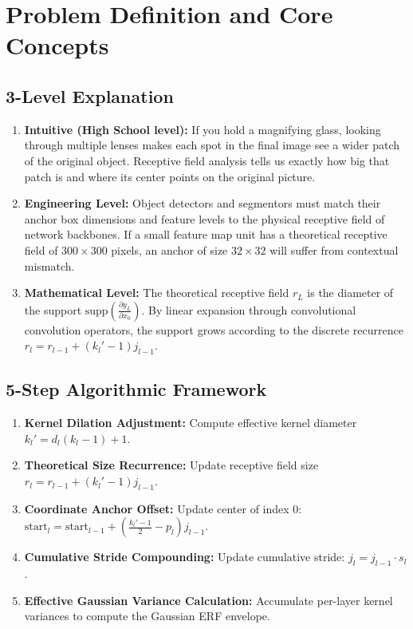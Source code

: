 \documentclass[11pt,a4paper]{article}
\theoremstyle{definition}
\begin{document}
\section{Problem Definition and Core Concepts}

\subsection{3-Level Explanation}
\begin{enumerate}
    \item \textbf{Intuitive (High School level):} If you hold a magnifying glass, looking through multiple lenses makes each spot in the final image see a wider patch of the original object. Receptive field analysis tells us exactly how big that patch is and where its center points on the original picture.
    \item \textbf{Engineering Level:} Object detectors and segmentors must match their anchor box dimensions and feature levels to the physical receptive field of network backbones. If a small feature map unit has a theoretical receptive field of $300 \times 300$ pixels, an anchor of size $32 \times 32$ will suffer from contextual mismatch.
    \item \textbf{Mathematical Level:} The theoretical receptive field $r_L$ is the diameter of the support $\text{supp}\left( \frac{\partial y_L}{\partial x_0} \right)$. By linear expansion through convolutional convolution operators, the support grows according to the discrete recurrence $r_l = r_{l-1} + (k_l' - 1) j_{l-1}$.
\end{enumerate}

\subsection{5-Step Algorithmic Framework}
\begin{enumerate}
    \item \textbf{Kernel Dilation Adjustment:} Compute effective kernel diameter $k_l' = d_l(k_l - 1) + 1$.
    \item \textbf{Theoretical Size Recurrence:} Update receptive field size $r_l = r_{l-1} + (k_l' - 1) j_{l-1}$.
    \item \textbf{Coordinate Anchor Offset:} Update center of index 0: $\text{start}_l = \text{start}_{l-1} + \left(\frac{k_l' - 1}{2} - p_l\right) j_{l-1}$.
    \item \textbf{Cumulative Stride Compounding:} Update cumulative stride: $j_l = j_{l-1} \cdot s_l$.
    \item \textbf{Effective Gaussian Variance Calculation:} Accumulate per-layer kernel variances to compute the Gaussian ERF envelope.
\end{enumerate}
\end{document}
